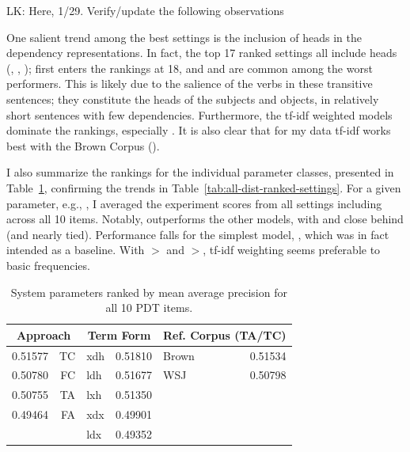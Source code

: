 \bigskip
LK: Here, 1/29. Verify/update the following observations
\bigskip

One salient trend among the best settings is the inclusion of heads in the dependency representations. In fact, the top 17 ranked settings all include heads (, , );  first enters the rankings at 18, and  and  are common among the worst performers. This is likely due to the salience of the verbs in these transitive sentences; they constitute the heads of the subjects and objects, in relatively short sentences with few dependencies.
Furthermore, the tf-idf weighted models dominate the rankings, especially . It is also clear that for my data tf-idf works best with the Brown Corpus ().

I also summarize the rankings for the individual parameter classes,
presented in Table~\ref{tab:dist-ranked-parameters}, confirming the
trends in Table~\ref{tab:all-dist-ranked-settings}. For a given
parameter, e.g., , I averaged the experiment scores from
all settings including  across all 10 items. Notably,  outperforms the other models, with  and  close behind (and nearly tied). Performance falls for the simplest model, , which was in fact intended as a baseline. With $>$ and $>$, tf-idf weighting seems preferable to basic frequencies.

\begin{table}
\begin{center}
\begin{tabular}{|l|r||l|r||l|r|}
\hline
\multicolumn{2}{|c||}{Approach} & \multicolumn{2}{|c||}{Term Form} & \multicolumn{2}{|c||}{Ref. Corpus (TA/TC)} \\
\hline
\hline
0.51577 & TC & xdh & 0.51810 & Brown & 0.51534 \\
\hline
0.50780 & FC & ldh & 0.51677 & WSJ & 0.50798 \\
\hline
0.50755 & TA & lxh & 0.51350 & & \\
\hline
0.49464 & FA & xdx & 0.49901 & & \\
\hline
& 	& ldx & 0.49352 &  & \\
\hline
\end{tabular}
\caption{System parameters ranked by mean average precision for all 10 PDT items.}
\label{tab:dist-ranked-parameters}
\end{center}
\end{table}

